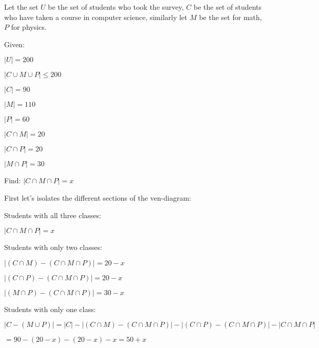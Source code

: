 \documentclass{article}
\newenvironment{Solution}
{\noindent\color{red}}
{\newline}
\begin{document}
\begin{Solution}
    Let the set $U$ be the set of students who took the survey, $C$ be the set of students who have taken a course in computer science,
    similarly let $M$ be the set for math,  $P$ for physics. 

    \phantom{ }

    Given: 
    \begin{adjustwidth}{2em}{0em} 
        $|U| = 200$

        $|C \cup M \cup P| \leq 200$ 

        $|C| = 90$

        $|M| = 110$

        $|P| = 60$

        $|C \cap M| = 20$

        $|C \cap P| = 20$
        
        $|M \cap P| = 30$ 
    \end{adjustwidth}

    \phantom{ }

    Find: $|C \cap M \cap P| = x$

    \phantom{ }

    First let's isolates the different sections of the ven-diagram:

    \begin{adjustwidth}{2em}{0em}
        Students with all three classes:
        \begin{adjustwidth}{2em}{0em}
            $|C \cap M \cap P| = x$
        \end{adjustwidth}

        Students with only two classes:

        \begin{adjustwidth}{2em}{0em}
            $|(C \cap M) - (C \cap M \cap P)| = 20 - x$

            $|(C \cap P) - (C \cap M \cap P)| = 20 - x$

            $|(M \cap P)- (C \cap M \cap P)| = 30 - x$ 
        \end{adjustwidth}

        Students with only one class:

        \begin{adjustwidth}{2em}{0em}
            $|C - (M \cup P)|  = |C| - |(C \cap M) - (C \cap M \cap P)| - |(C \cap P) - (C \cap M \cap P)| - |C \cap M \cap P|$

            \hspace*{6.585em}$ = 90 - (20 - x) - (20 - x) - x = 50 + x$


\end{adjustwidth}
\end{adjustwidth}
\end{Solution}
\end{document}
